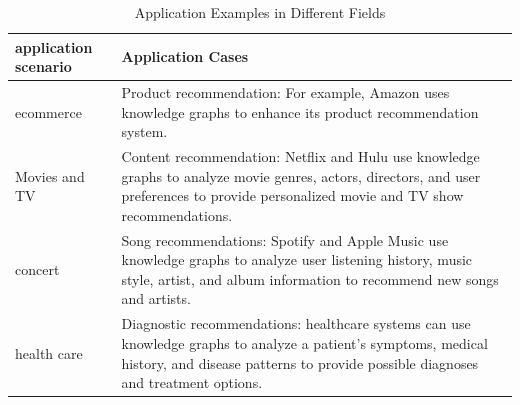 \begin{table}[h]
\centering
\caption{Application Examples in Different Fields \parencite{yu2024review}}
\begin{tabular}{|p{}|p{}|}
\hline
\textbf{application scenario} & \textbf{Application Cases} \\
\hline
ecommerce & Product recommendation: For example, Amazon uses knowledge graphs to enhance its product recommendation system. \\
\hline
Movies and TV & Content recommendation: Netflix and Hulu use knowledge graphs to analyze movie genres, actors, directors, and user preferences to provide personalized movie and TV show recommendations. \\
\hline
concert & Song recommendations: Spotify and Apple Music use knowledge graphs to analyze user listening history, music style, artist, and album information to recommend new songs and artists. \\
\hline
health care & Diagnostic recommendations: healthcare systems can use knowledge graphs to analyze a patient's symptoms, medical history, and disease patterns to provide possible diagnoses and treatment options. \\
\hline
\end{tabular}
\end{table}